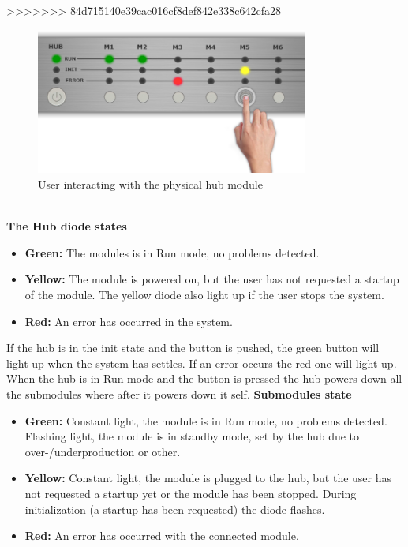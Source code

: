 >>>>>>> 84d715140e39cac016cf8def842e338c642cfa28
		\begin{figure}[h!]		%
			\begin{centering}
				 \includegraphics[width=0.8\textwidth]{images/hub_user_interact.png}
				\caption{User interacting with the physical hub module}
		 	\end{centering}
		\end{figure}
		\textbf{ } \\ 
		\textbf{The Hub diode states}
		\begin{itemize}
			\item \textbf{Green: }The modules is in Run mode, no problems detected.
			\item \textbf{Yellow: }The module is powered on, but the user has not requested a startup of the module.
							The yellow diode also light up if the user stops the system.
			\item \textbf{Red: }An error has occurred in the system.
		\end{itemize}
		If the hub is in the init state and the button is pushed, the green button will light up when the system has settles. If an error occurs the red one will light up.
		When the hub is in Run mode and the button is pressed the hub powers down all the submodules where after it powers down it self.
		\textbf{Submodules state}
		\begin{itemize}
			\item \textbf{Green: }Constant light, the module is in Run mode, no problems detected. Flashing light, the module is in standby mode, set by the hub
							due to over-/underproduction or other.
			\item \textbf{Yellow: }Constant light, the module is plugged to the hub, but the user has not requested a startup yet or the module has been stopped.
							During initialization (a startup has been requested) the diode flashes.
			\item \textbf{Red: }An error has occurred with the connected module.
		\end{itemize}
